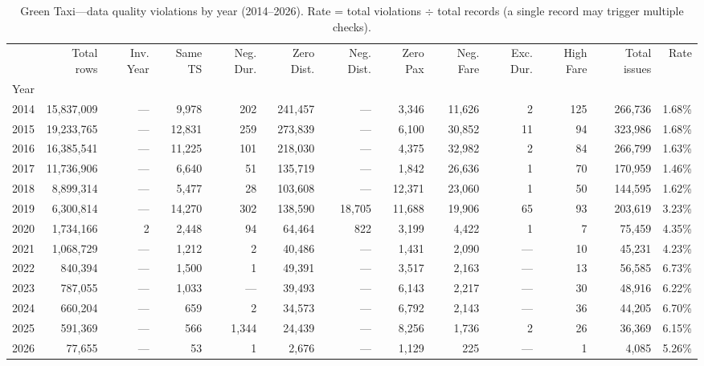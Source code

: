 \begin{table}
\caption{Green Taxi---data quality violations by year (2014--2026). Rate = total violations $\div$ total records (a single record may trigger multiple checks).}
\label{tab:t2_green_tripdata}
\begin{tabular}{rrrrrrrrrrrrr}
\toprule
 & Total rows & Inv. Year & Same TS & Neg. Dur. & Zero Dist. & Neg. Dist. & Zero Pax & Neg. Fare & Exc. Dur. & High Fare & Total issues & Rate \\
Year &  &  &  &  &  &  &  &  &  &  &  &  \\
\midrule
2014 & 15,837,009 & --- & 9,978 & 202 & 241,457 & --- & 3,346 & 11,626 & 2 & 125 & 266,736 & 1.68\% \\
2015 & 19,233,765 & --- & 12,831 & 259 & 273,839 & --- & 6,100 & 30,852 & 11 & 94 & 323,986 & 1.68\% \\
2016 & 16,385,541 & --- & 11,225 & 101 & 218,030 & --- & 4,375 & 32,982 & 2 & 84 & 266,799 & 1.63\% \\
2017 & 11,736,906 & --- & 6,640 & 51 & 135,719 & --- & 1,842 & 26,636 & 1 & 70 & 170,959 & 1.46\% \\
2018 & 8,899,314 & --- & 5,477 & 28 & 103,608 & --- & 12,371 & 23,060 & 1 & 50 & 144,595 & 1.62\% \\
2019 & 6,300,814 & --- & 14,270 & 302 & 138,590 & 18,705 & 11,688 & 19,906 & 65 & 93 & 203,619 & 3.23\% \\
2020 & 1,734,166 & 2 & 2,448 & 94 & 64,464 & 822 & 3,199 & 4,422 & 1 & 7 & 75,459 & 4.35\% \\
2021 & 1,068,729 & --- & 1,212 & 2 & 40,486 & --- & 1,431 & 2,090 & --- & 10 & 45,231 & 4.23\% \\
2022 & 840,394 & --- & 1,500 & 1 & 49,391 & --- & 3,517 & 2,163 & --- & 13 & 56,585 & 6.73\% \\
2023 & 787,055 & --- & 1,033 & --- & 39,493 & --- & 6,143 & 2,217 & --- & 30 & 48,916 & 6.22\% \\
2024 & 660,204 & --- & 659 & 2 & 34,573 & --- & 6,792 & 2,143 & --- & 36 & 44,205 & 6.70\% \\
2025 & 591,369 & --- & 566 & 1,344 & 24,439 & --- & 8,256 & 1,736 & 2 & 26 & 36,369 & 6.15\% \\
2026 & 77,655 & --- & 53 & 1 & 2,676 & --- & 1,129 & 225 & --- & 1 & 4,085 & 5.26\% \\
\bottomrule
\end{tabular}
\end{table}
